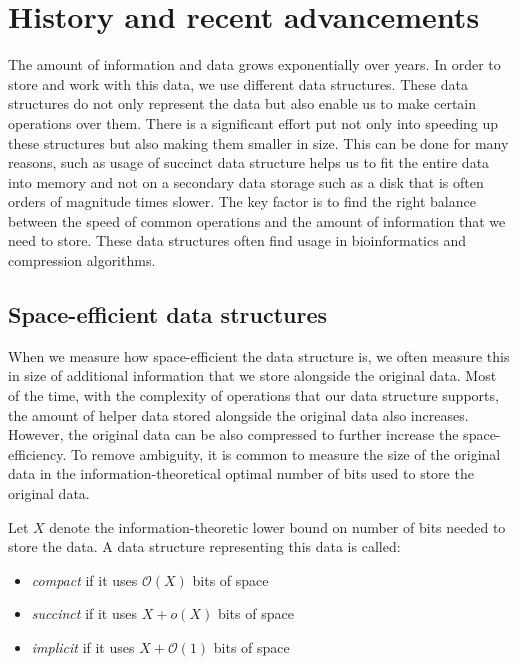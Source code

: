 \chapter{History and recent advancements}
\label{kap:kap1}

The amount of information and data grows exponentially over years. In order to store and work with this data, we use different data structures. These data structures do not only represent the data but also enable us to make certain operations over them. There is a significant effort put not only into speeding up these structures but also making them smaller in size.
This can be done for many reasons, such as usage of succinct data structure helps us to fit the entire data into memory and not on a secondary data storage such as a disk that is often orders of magnitude times slower. The key factor is to find the right balance between the speed of common operations and the amount of information that we need to store. These data structures often find usage in bioinformatics and compression algorithms.

\section{Space-efficient data structures}

When we measure how space-efficient the data structure is, we often measure this in size of additional information that we store alongside the original data. Most of the time, with the complexity of operations that our data structure supports, the amount of helper data stored alongside the original data also increases. However, the original data can be also compressed to further increase the space-efficiency. To remove ambiguity, it is common to measure the size of the original data in the information-theoretical optimal number of bits used to store the original data.

\begin{definition}
Let $X$ denote the information-theoretic lower bound on number of bits needed to store the data. A data structure representing this data is called:
\begin{itemize}
    \item \emph{compact} if it uses $\mathcal{O}(X)$ bits of space
    \item \emph{succinct} if it uses $X + o(X)$ bits of space
    \item \emph{implicit} if it uses $X + \mathcal{O}(1)$ bits of space
\end{itemize}
\end{definition}

